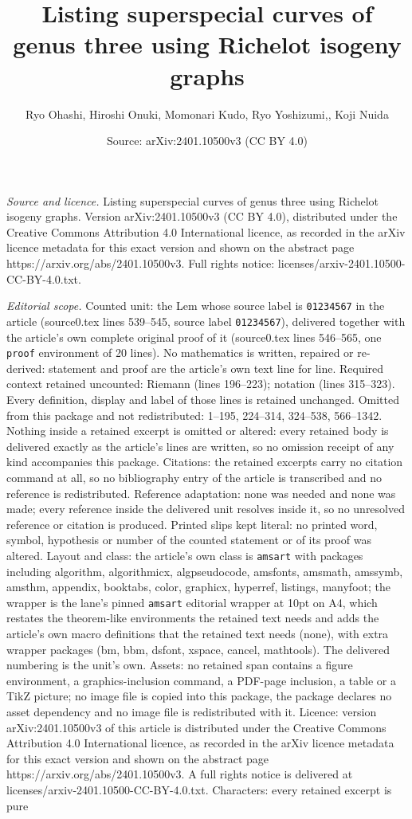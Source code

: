 \documentclass[10pt,a4paper]{amsart}
\title[Listing superspecial curves of genus three using Richelot is]{Listing superspecial curves of genus three using Richelot isogeny graphs}
\author{Ryo Ohashi, Hiroshi Onuki, Momonari Kudo, Ryo Yoshizumi,, Koji Nuida}
\date{Source: arXiv:2401.10500v3 (CC BY 4.0)}
\begin{document}
\maketitle

\noindent\emph{Source and licence.} Listing superspecial curves of genus three using Richelot isogeny graphs. Version arXiv:2401.10500v3 (CC BY 4.0), distributed under the Creative Commons Attribution 4.0 International licence, as recorded in the arXiv licence metadata for this exact version and shown on the abstract page https://arxiv.org/abs/2401.10500v3. Full rights notice: licenses/arxiv-2401.10500-CC-BY-4.0.txt.\par\smallskip

\noindent\textit{Editorial scope.} Counted unit: the Lem whose source label is \texttt{01234567} in the article (source0.tex lines 539--545, source label \texttt{01234567}), delivered together with the article's own complete original proof of it (source0.tex lines 546--565, one \texttt{proof} environment of 20 lines). No mathematics is written, repaired or re-derived: statement and proof are the article's own text line for line. Required context retained uncounted: Riemann (lines 196--223); notation (lines 315--323). Every definition, display and label of those lines is retained unchanged. Omitted from this package and not redistributed: 1--195, 224--314, 324--538, 566--1342. Nothing inside a retained excerpt is omitted or altered: every retained body is delivered exactly as the article's lines are written, so no omission receipt of any kind accompanies this package. Citations: the retained excerpts carry no citation command at all, so no bibliography entry of the article is transcribed and no reference is redistributed. Reference adaptation: none was needed and none was made; every reference inside the delivered unit resolves inside it, so no unresolved reference or citation is produced. Printed slips kept literal: no printed word, symbol, hypothesis or number of the counted statement or of its proof was altered. Layout and class: the article's own class is \texttt{amsart} with packages including algorithm, algorithmicx, algpseudocode, amsfonts, amsmath, amssymb, amsthm, appendix, booktabs, color, graphicx, hyperref, listings, manyfoot; the wrapper is the lane's pinned \texttt{amsart} editorial wrapper at 10pt on A4, which restates the theorem-like environments the retained text needs and adds the article's own macro definitions that the retained text needs (none), with extra wrapper packages (bm, bbm, dsfont, xspace, cancel, mathtools). The delivered numbering is the unit's own. Assets: no retained span contains a figure environment, a graphics-inclusion command, a PDF-page inclusion, a table or a TikZ picture; no image file is copied into this package, the package declares no asset dependency and no image file is redistributed with it. Licence: version arXiv:2401.10500v3 of this article is distributed under the Creative Commons Attribution 4.0 International licence, as recorded in the arXiv licence metadata for this exact version and shown on the abstract page https://arxiv.org/abs/2401.10500v3. A full rights notice is delivered at licenses/arxiv-2401.10500-CC-BY-4.0.txt. Characters: every retained excerpt is pure 
\end{document}
